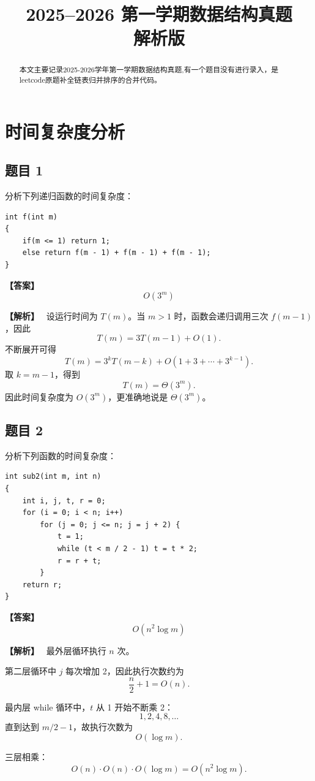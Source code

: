 \documentclass[12pt,a4paper]{ctexart}
\title{\textbf{2025--2026 第一学期数据结构真题\\解析版}}
\author{}
\date{}
\newenvironment{solution}
{\par\noindent\textbf{\color{answerblue}【解析】}\ }
{\par}
\newenvironment{answer}
{\par\noindent\textbf{\color{darkgreen}【答案】}\ }
{\par}
\begin{document}
\maketitle
\tableofcontents
\newpage

\begin{abstract}
    本文主要记录2025-2026学年第一学期数据结构真题,有一个题目没有进行录入，是leetcode原题补全链表归并排序的合并代码。
\end{abstract}

\section{时间复杂度分析}

\subsection*{题目 1}
分析下列递归函数的时间复杂度：
\begin{lstlisting}
int f(int m)
{
    if(m <= 1) return 1;
    else return f(m - 1) + f(m - 1) + f(m - 1);
}
\end{lstlisting}

\begin{answer}
\[
\boxed{O(3^m)}
\]
\end{answer}

\begin{solution}
设运行时间为 $T(m)$。当 $m>1$ 时，函数会递归调用三次 $f(m-1)$，因此
\[
T(m)=3T(m-1)+O(1).
\]
不断展开可得
\[
T(m)=3^kT(m-k)+O(1+3+\cdots+3^{k-1}).
\]
取 $k=m-1$，得到
\[
T(m)=\Theta(3^m).
\]
因此时间复杂度为 $O(3^m)$，更准确地说是 $\Theta(3^m)$。
\end{solution}

\subsection*{题目 2}
分析下列函数的时间复杂度：
\begin{lstlisting}
int sub2(int m, int n)
{
    int i, j, t, r = 0;
    for (i = 0; i < n; i++)
        for (j = 0; j <= n; j = j + 2) {
            t = 1;
            while (t < m / 2 - 1) t = t * 2;
            r = r + t;
        }
    return r;
}
\end{lstlisting}

\begin{answer}
\[
\boxed{O(n^2\log m)}
\]
\end{answer}

\begin{solution}
最外层循环执行 $n$ 次。

第二层循环中 $j$ 每次增加 2，因此执行次数约为
\[
\frac{n}{2}+1=O(n).
\]

最内层 while 循环中，$t$ 从 1 开始不断乘 2：
\[
1,2,4,8,\dots
\]
直到达到 $m/2-1$，故执行次数为
\[
O(\log m).
\]

三层相乘：
\[
O(n)\cdot O(n)\cdot O(\log m)
=
\boxed{O(n^2\log m)}.
\]
\end{solution}
\end{document}
